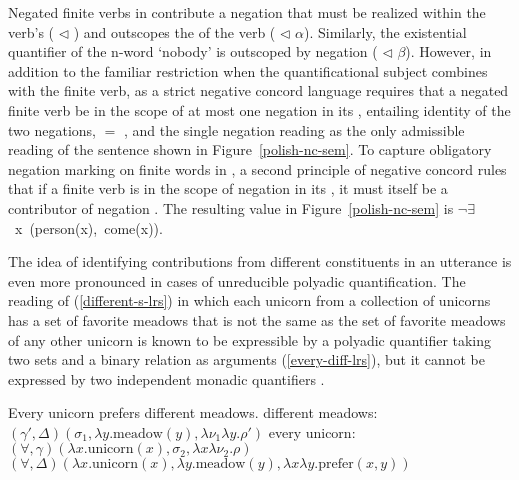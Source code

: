 \documentclass[output=paper
 	        ,biblatex
                ,babelshorthands
                ,newtxmath
                ,draftmode
                ,colorlinks, citecolor=brown
]{langscibook}
\begin{document}
Negated finite verbs in  contribute a negation that must be realized
within the verb's  ( $\triangleleft$ ) and
outscopes the  of the verb ( $\triangleleft$ $\alpha$).
Similarly, the existential quantifier of the n-word  `nobody' is
outscoped by negation ( $\triangleleft$ $\beta$). However, in addition
to the familiar restriction when the quantificational subject combines
with the finite verb,  as a strict negative concord language requires
that a negated finite verb be in the scope of at most one negation in
its , entailing identity of the two negations,
 $=$ , and the single negation reading  as
the only admissible reading of the sentence shown in Figure~\ref{polish-nc-sem}.
To capture obligatory negation marking on finite words in , a second
principle of negative concord rules that if a finite verb is in the scope
of negation in its , it must itself be a contributor of negation \citep[316]{RichterandSailer2001}. The resulting  value
in Figure~\ref{polish-nc-sem} is \mbox{{\normalfont \sffamily $\neg \exists$ x (person(x), come(x))}}.

The idea of identifying contributions from different constituents in
an utterance is even more pronounced in cases of unreducible polyadic
quantification. The reading of (\ref{different-s-lrs}) in which each
unicorn from a collection of unicorns has a set of favorite meadows that
is not the same as the set of favorite meadows of any other unicorn is known
to be expressible by a polyadic quantifier taking two sets and a binary
relation as arguments (\ref{every-diff-lrs}), but it cannot be expressed by
two independent monadic quantifiers \citep{Keenan1992b}.


\begin{exe}
\ex\label{different-lrs}
\begin{xlist}
\ex\label{different-s-lrs} Every unicorn prefers different meadows.
\ex \label{different-meadows-lrs}
different meadows: \hspace{0.18cm} $(\gamma', \Delta)(\sigma_1, \lambda y.\text{meadow}(y), \lambda \nu_1\lambda y.\rho')$
\ex \label{every-unicorn-lrs}
every unicorn: \hspace{0.95cm}$(\forall, \gamma)(\lambda x.\text{unicorn}(x), \sigma_2, \lambda x\lambda \nu_2.\rho)$
\ex \label{every-diff-lrs}
$(\forall, \Delta)(\lambda x.\text{unicorn}(x), \lambda y.\text{meadow}(y), \lambda x\lambda y.\text{prefer}(x,y))$
\end{xlist}
\end{exe}
\end{document}
